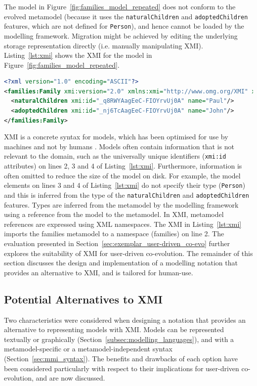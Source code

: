 The model in Figure~\ref{fig:families_model_repeated} does not conform to the evolved metamodel (because it uses the \texttt{na\-tu\-ralCh\-il\-dr\-en} and \texttt{ad\-op\-t\-edCh\-il\-dr\-en} features, which are not defined for \texttt{Pe\-rs\-on}), and hence cannot be loaded by the modelling framework. Migration might be achieved by editing the underlying storage representation directly (i.e. manually manipulating XMI). Listing~\ref{lst:xmi} shows the XMI for the model in Figure~\ref{fig:families_model_repeated}.

\begin{lstlisting}[caption=XMI for the family model in Figure~\ref{fig:families_model_repeated}, label=lst:xmi, language=XML]
<?xml version="1.0" encoding="ASCII"?>
<families:Family xmi:version="2.0" xmlns:xmi="http://www.omg.org/XMI" xmlns:families="families" xmi:id="_kE2LkAagEeC-FIOYrvUj0A" name="Smiths">
  <naturalChildren xmi:id="_q8RWYAagEeC-FIOYrvUj0A" name="Paul"/>
  <adoptedChildren xmi:id="_nj6TcAagEeC-FIOYrvUj0A" name="John"/>
</families:Family>
\end{lstlisting}

XMI is a concrete syntax for models, which has been optimised for use by machines and not by humans \cite{hutn}. Models often contain information that is not relevant to the domain, such as the universally unique identifiers (\texttt{xmi:id} attributes) on lines 2, 3 and 4 of Listing~\ref{lst:xmi}. Furthermore, information is often omitted to reduce the size of the model on disk. For example, the model elements on lines 3 and 4 of Listing~\ref{lst:xmi} do not specify their type (\texttt{Pe\-rs\-on}) and this is inferred from the type of the \texttt{na\-tu\-ralCh\-il\-dr\-en} and \texttt{ad\-op\-t\-edCh\-il\-dr\-en} features. Types are inferred from the metamodel by the modelling framework using a reference from the model to the metamodel. In XMI, metamodel references are expressed using XML namespaces. The XMI in Listing~\ref{lst:xmi} imports the families metamodel to a namespace (families) on line 2. The evaluation presented in Section~\ref{sec:exemplar_user-driven_co-evo} further explores the suitability of XMI for user-driven co-evolution. The remainder of this section discusses the design and implementation of a modelling notation that provides an alternative to XMI, and is tailored for human-use.

\subsection{Potential Alternatives to XMI}
\label{subsec:alternatives_to_xmi}
Two characteristics were considered when designing a notation that provides an alternative to representing models with XMI. Models can be represented textually or graphically (Section~\ref{subsec:modelling_languages}), and with a metamodel-specific or a metamodel-independent syntax (Section~\ref{sec:mmi_syntax}). The benefits and drawbacks of each option have been considered particularly with respect to their implications for user-driven co-evolution, and are now discussed.

